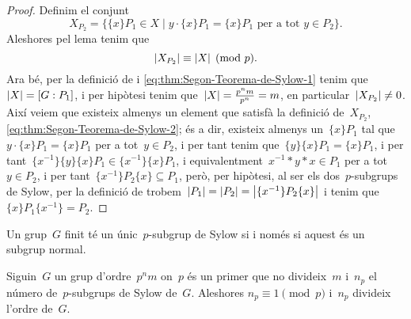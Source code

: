\documentclass[../../main.tex]{subfiles}
\begin{document}
\begin{proof}
        Definim el conjunt
        \begin{equation}
    \label{eq:thm:Segon-Teorema-de-Sylow-2}
        X_{P_{2}}=\{\{x\}P_{1}\in X\mid y\cdot\{x\}P_{1}=\{x\}P_{1}\text{ per a tot }y\in P_{2}\}.
        \end{equation}
        Aleshores pel lema  tenim que
        \begin{equation*}
        \abs{X_{P_{2}}}\equiv\abs{X}\pmod{p}.
        \end{equation*}
        Ara bé, per la definició de  i \eqref{eq:thm:Segon-Teorema-de-Sylow-1} tenim que~\(\abs{X}=[G:P_{1}]\), i per hipòtesi tenim que~\(\abs{X}=\frac{p^{n}m}{p^{n}}=m\), en particular~\(\abs{X_{P_{2}}}\neq0\).
        Així veiem que existeix almenys un element que satisfà la definició de~\(X_{P_{2}}\), \eqref{eq:thm:Segon-Teorema-de-Sylow-2}; és a dir, existeix almenys un~\(\{x\}P_{1}\) tal que~\(y\cdot\{x\}P_{1}=\{x\}P_{1}\) per a tot~\(y\in P_{2}\), i per tant tenim que~\(\{y\}\{x\}P_{1}=\{x\}P_{1}\), i per tant~\(\{x^{-1}\}\{y\}\{x\}P_{1}\in \{x^{-1}\}\{x\}P_{1}\), i equivalentment~\(x^{-1}\ast y\ast x\in P_{1}\) per a tot~\(y\in P_{2}\), i per tant~\(\{x^{-1}\}P_{2}\{x\}\subseteq P_{1}\), però, per hipòtesi, al ser els dos~\(p\)-subgrups de Sylow, per la definició de  trobem~\(\abs{P_{1}}=\abs{P_{2}}=\abs{\{x^{-1}\}P_{2}\{x\}}\) i tenim que~\(\{x\}P_{1}\{x^{-1}\}=P_{2}\).
    \end{proof}
    \begin{corollary}
        \label{corollary:Segon-Teorema-de-Sylow} %
        Un grup~\(G\) finit té un únic~\(p\)-subgrup de Sylow si i només si aquest és un subgrup normal.
    \end{corollary}
    \begin{theorem}
        \label{thm:Tercer-Teorema-de-Sylow}
        Siguin~\(G\) un grup d'ordre~\(p^{n}m\) on~\(p\) és un primer que no divideix~\(m\) i~\(n_{p}\) el número de~\(p\)-subgrups de Sylow de~\(G\).
        Aleshores
        \(n_{p}\equiv1\pmod{p}\) i~\(n_{p}\) divideix l'ordre de~\(G\).
    \end{theorem}
\end{document}
